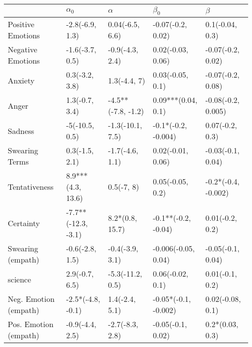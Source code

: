 \begin{tabular}{lllll}
\toprule
{} &           $\alpha_0$ &            $\alpha$ &             $\beta_0$ &              $\beta$ \\
\midrule
Positive Emotions     &      -2.8(-6.9, 1.3) &     0.04(-6.5, 6.6) &     -0.07(-0.2, 0.02) &      0.1(-0.04, 0.3) \\
Negative Emotions     &      -1.6(-3.7, 0.5) &     -0.9(-4.3, 2.4) &     0.02(-0.03, 0.06) &    -0.07(-0.2, 0.02) \\
Anxiety               &       0.3(-3.2, 3.8) &        1.3(-4.4, 7) &      0.03(-0.05, 0.1) &    -0.07(-0.2, 0.08) \\
Anger                 &       1.3(-0.7, 3.4) &  -4.5**(-7.8, -1.2) &    0.09***(0.04, 0.1) &   -0.08(-0.2, 0.005) \\
Sadness               &       -5(-10.5, 0.5) &    -1.3(-10.1, 7.5) &   -0.1*(-0.2, -0.004) &      0.07(-0.2, 0.3) \\
Swearing Terms        &       0.3(-1.5, 2.1) &     -1.7(-4.6, 1.1) &     0.02(-0.01, 0.06) &    -0.03(-0.1, 0.04) \\
Tentativeness         &    8.9***(4.3, 13.6) &          0.5(-7, 8) &      0.05(-0.05, 0.2) &  -0.2*(-0.4, -0.002) \\
Certainty             &  -7.7**(-12.3, -3.1) &     8.2*(0.8, 15.7) &   -0.1**(-0.2, -0.04) &      0.01(-0.2, 0.2) \\
Swearing (empath)     &      -0.6(-2.8, 1.5) &     -0.4(-3.9, 3.1) &   -0.006(-0.05, 0.04) &    -0.05(-0.1, 0.04) \\
science               &       2.9(-0.7, 6.5) &    -5.3(-11.2, 0.5) &      0.06(-0.02, 0.1) &      0.01(-0.1, 0.2) \\
Neg. Emotion (empath) &    -2.5*(-4.8, -0.1) &      1.4(-2.4, 5.1) &  -0.05*(-0.1, -0.002) &     0.02(-0.08, 0.1) \\
Pos. Emotion (empath) &      -0.9(-4.4, 2.5) &     -2.7(-8.3, 2.8) &     -0.05(-0.1, 0.02) &      0.2*(0.03, 0.3) \\
\bottomrule
\end{tabular}
